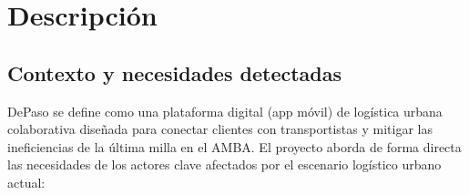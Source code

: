 \chapter{Descripción}
\label{cap:descripcion}

\section{Contexto y necesidades detectadas}

DePaso se define como una plataforma digital (app móvil) de logística urbana colaborativa diseñada para conectar clientes con transportistas y mitigar las ineficiencias de la última milla en el AMBA. El proyecto aborda de forma directa las necesidades de los actores clave afectados por el escenario logístico urbano actual:

